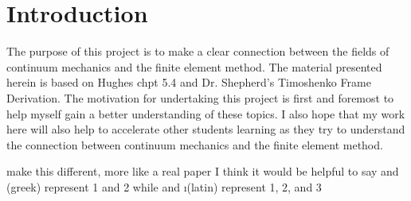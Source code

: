 \section{Introduction}

The purpose of this project is to make a clear connection between the fields of continuum mechanics and the finite element method. 
The material presented herein is based on Hughes chpt 5.4 and Dr. Shepherd's Timoshenko Frame Derivation.
The motivation for undertaking this project is first and foremost to help myself gain a better understanding of these topics. 
I also hope that my work here will also help to accelerate other students learning as they try to understand the connection between continuum mechanics and the finite element method. 

{\Rd make this different, more like a real paper}
I think it would be helpful to say \alpha and \beta (greek) represent 1 and 2 while \e and \i (latin) represent 1, 2, and 3